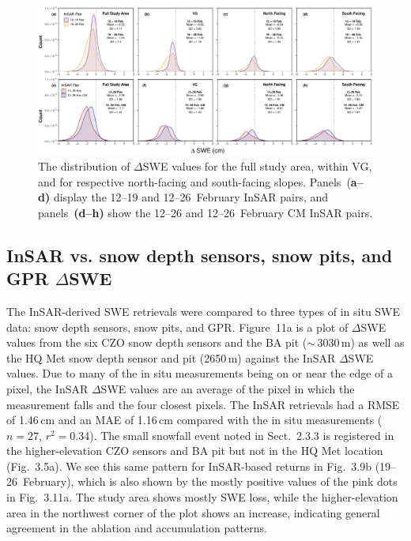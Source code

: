 \begin{figure}[t]
\includegraphics[width=\textwidth]{figures/ch3_figs/fig10.pdf}
\caption{The distribution of $\Delta$SWE values for the full study area, within VG, and for respective north-facing and south-facing slopes. Panels~(\textbf{a--d)} display the 12--19 and 12--26~February InSAR pairs, and panels~\textbf{(d--h)} show the 12--26 and 12--26~February CM InSAR pairs.}
\end{figure}

\hypertarget{ch3-results-2}{\subsection{InSAR vs. snow depth sensors, snow pits, and GPR $\Delta$SWE}\label{ch3-results-2}}


The InSAR-derived SWE retrievals were compared to three types of in situ SWE data: snow depth sensors, snow pits, and GPR. Figure~11a is a plot of $\Delta$SWE values from the six CZO snow depth sensors and the BA pit ($\sim$\,3030\,m) as well as the HQ Met snow depth sensor and pit (2650\,m) against the InSAR $\Delta$SWE values. Due to many of the in situ measurements being on or near the edge of a pixel, the InSAR $\Delta$SWE values are an average of the pixel in which the measurement falls and the four closest pixels. The InSAR retrievals had a RMSE of 1.46\,cm and an MAE of 1.16\,cm compared with the in situ measurements ($n = 27$, $r^{2} = 0$.34). The small snowfall event noted in Sect.~2.3.3 is registered in the higher-elevation CZO sensors and BA pit but not in the HQ Met location (Fig.~3.5a). We see this same pattern for InSAR-based returns in Fig.~3.9b (19--26~February), which is also shown by the mostly positive values of the pink dots in Fig.~3.11a. The study area shows mostly SWE loss, while the higher-elevation area in the northwest corner of the plot shows an increase, indicating general agreement in the ablation and accumulation patterns.

